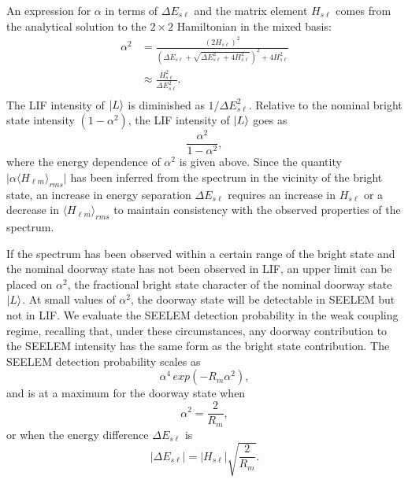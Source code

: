 \documentclass[12pt]{mitthesis}
\begin{document}
An expression for $\alpha$ in terms of $\Delta E_{s\ell}$ and the matrix
element $H_{s\ell}$ comes from the analytical solution to the $2 \times
2$ Hamiltonian in the mixed basis:
\begin{equation}
  \begin{split}
    \alpha^2& = 
      \frac{\left ( 2 H_{s\ell} \right )^2}{
          \left (
            \Delta E_{s\ell} + 
            \sqrt{\Delta E_{s\ell}^2 + 4 H_{s\ell}^2}
          \right )^2
          + 4 H_{s\ell}^2
      }\\
      & \approx \frac{H_{s\ell}^2}{\Delta E_{s\ell}^2}.\\
      \end{split}
\end{equation}
The LIF intensity of $\mathinner{|{L}\rangle}$ is diminished as $1 / \Delta
E_{s\ell}^2$.  Relative to the nominal bright state intensity
$(1-\alpha^2)$, the LIF intensity of $\mathinner{|{L}\rangle}$ goes as
\begin{equation}
  \frac{\alpha^2}{1-\alpha^2},
\end{equation}
where the energy dependence of $\alpha^2$ is given above.  Since the
quantity $\lvert \alpha \langle H_{\ell m} \rangle_{rms} \rvert$ has
been inferred from the spectrum in the vicinity of the bright state,
an increase in energy separation $\Delta E_{s\ell}$ requires an
increase in $H_{s\ell}$ or a decrease in $\langle H_{\ell m}
\rangle_{rms}$ to maintain consistency with the observed properties of
the spectrum.

If the spectrum has been observed within a certain range of the bright
state and the nominal doorway state has not been observed in LIF, an
upper limit can be placed on $\alpha^2$, the fractional bright state
character of the nominal doorway state $\mathinner{|{L}\rangle}$. At small values
of $\alpha^2$, the doorway state will be detectable in SEELEM but not
in LIF.  We evaluate the SEELEM detection probability in the weak
coupling regime, recalling that, under these circumstances, any doorway
contribution to the SEELEM intensity has the same form as the bright
state contribution.  The SEELEM detection probability scales as
\begin{equation}
  \alpha^4 \, exp(-R_m \alpha^2),
\end{equation}
and is at a maximum for the doorway state when
\begin{equation}
  \alpha^2 = \frac{2}{R_m},
\end{equation}
or when the energy difference $\Delta E_{s\ell}$ is
\begin{equation}
  \lvert \Delta E_{s\ell} \rvert = 
  \lvert H_{s\ell} \rvert \sqrt{\frac{2}{R_m}}.
\end{equation}
\end{document}
